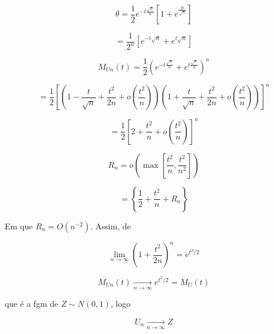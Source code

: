 \begin{equation}
\theta = \frac{1}{2} e^{-t\frac{\sqrt{n}}{n}} \left[ 1 + e^{\frac{2t}{\sqrt{n}}} \right]
\end{equation}

\begin{equation}
= \frac{1}{2^n} \left[ e^{-t\sqrt{n}} + e^{t\sqrt{n}} \right]
\end{equation}

\begin{equation}
M_{Un}(t) = \frac{1}{2} \left( e^{-t\frac{\sqrt{n}}{n}} + e^{t\frac{\sqrt{n}}{n}} \right)^n
\end{equation}

\begin{equation}
= \frac{1}{2} \left[ \left( 1 - \frac{t}{\sqrt{n}} + \frac{t^2}{2n} + o\left( \frac{t^2}{n} \right) \right) \left( 1 + \frac{t}{\sqrt{n}} + \frac{t^2}{2n} + o\left( \frac{t^2}{n} \right) \right) \right]^n
\end{equation}

\begin{equation}
= \frac{1}{2} \left[ 2 + \frac{t^2}{n} + o\left( \frac{t^2}{n} \right) \right]^n
\end{equation}

\begin{equation}
R_n = o\left( \max\left[ \frac{t^2}{n}, \frac{t^2}{n^2} \right] \right)
\end{equation}

\begin{equation}
= \left\{ \frac{1}{2} + \frac{t^2}{n} + R_n \right\}
\end{equation}

Em que $R_n = O(n^{-2})$. Assim, de

\begin{equation}
\lim_{n \to \infty} \left( 1 + \frac{t^2}{2n} \right)^n = e^{t^2/2}
\end{equation}

\begin{equation}
M_{Un}(t) \xrightarrow[n \to \infty]{} e^{t^2/2} = M_U(t)
\end{equation}

que é a fgm de $Z \sim N(0,1)$, logo

\begin{equation}
U_n \xrightarrow[n \to \infty]{} Z
\end{equation}